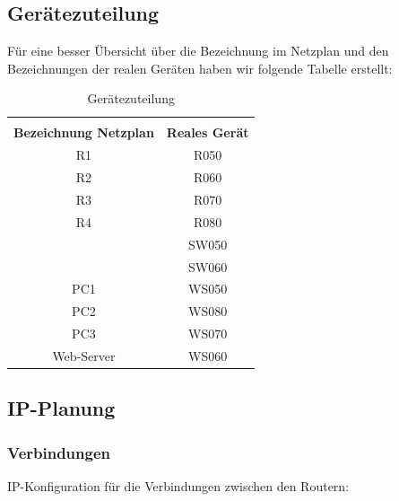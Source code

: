 \documentclass[a4paper, ngerman]{article}
\begin{document}
\subsection{Gerätezuteilung}

Für eine besser Übersicht über die Bezeichnung im Netzplan und den Bezeichnungen der realen Geräten haben wir folgende Tabelle erstellt:

\begin{table}[ht]
    \caption{Gerätezuteilung} %
    \centering %
    \begin{tabular}{c c} %
        \hline\hline
        \\
        \textbf{Bezeichnung Netzplan} & \textbf{Reales Gerät} \\ [0.5ex]
        \hline
        R1                            & R050                  \\ %
        R2                            & R060                  \\
        R3                            & R070                  \\
        R4                            & R080                  \\
                                      & SW050                 \\
                                      & SW060                 \\
        PC1                           & WS050                 \\
        PC2                           & WS080                 \\
        PC3                           & WS070                 \\
        Web-Server                    & WS060                 \\ [1ex] %
        \hline
    \end{tabular}
    \label{table:nonlin} %
\end{table}


\subsection{IP-Planung}

\subsubsection{Verbindungen}
IP-Konfiguration für die Verbindungen zwischen den Routern:
\end{document}
